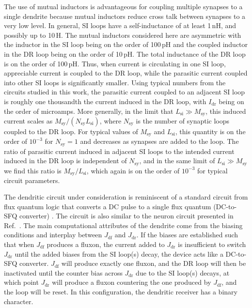 \documentclass[twocolumn]{article}
\newcommand{\onlinecite}[1]{\hspace{-1 ex} \nocite{#1}\citenum{#1}}
\begin{document}
The use of mutual inductors is advantageous for coupling multiple synapses to a single dendrite because mutual inductors reduce cross talk between synapses to a very low level. In general, SI loops have a self-inductance of at least 1\,nH, and possibly up to 10\,\textmu H. The mutual inductors considered here are asymmetric with the inductor in the SI loop being on the order of 100\,pH and the coupled inductor in the DR loop being on the order of 10\,pH. The total inductance of the DR loop is on the order of 100\,pH. Thus, when current is circulating in one SI loop, appreciable current is coupled to the DR loop, while the parasitic current coupled into other SI loops is significantly smaller. Using typical numbers from the circuits studied in this work, the parasitic current coupled to an adjacent SI loop is roughly one thousandth the current induced in the DR loop, with $I_{\mathrm{dr}}$ being on the order of microamps. More generally, in the limit that $L_{\mathrm{si}} \gg M_{\mathrm{sy}}$, this induced current scales as $M_{\mathrm{sy}}/(N_{\mathrm{sy}}L_{\mathrm{si}})$, where $N_{\mathrm{sy}}$ is the number of synaptic loops coupled to the DR loop. For typical values of $M_{\mathrm{sy}}$ and $L_{\mathrm{si}}$, this quantity is on the order of $10^{-3}$ for $N_{\mathrm{sy}}=1$ and decreases as synapses are added to the loop. The ratio of parasitic current induced in adjacent SI loops to the intended current induced in the DR loop is independent of $N_{\mathrm{sy}}$, and in the same limit of $L_{\mathrm{si}} \gg M_{\mathrm{sy}}$ we find this ratio is $M_{\mathrm{sy}}/L_{\mathrm{si}}$, which again is on the order of $10^{-3}$ for typical circuit parameters.

The dendritic circuit under consideration is reminiscent of a standard circuit from flux quantum logic that converts a DC pulse to a single flux quantum (DC-to-SFQ converter) \cite{vatu1998,ka1999}. The circuit is also similar to the neuron circuit presented in Ref.\,\onlinecite{crsc2010}. The main computational attributes of the dendrite come from the biasing conditions and interplay between $J_{\mathrm{df}}$ and $J_{\mathrm{dr}}$. If the biases are established such that when $J_{\mathrm{df}}$ produces a fluxon, the current added to $J_{\mathrm{dr}}$ is insufficient to switch $J_{\mathrm{dr}}$ until the added biases from the SI loop(s) decay, the device acts like a DC-to-SFQ converter. $J_{\mathrm{df}}$ will produce exactly one fluxon, and the DR loop will then be inactivated until the counter bias across $J_{\mathrm{dr}}$ due to the SI loop(s) decays, at which point $J_{\mathrm{dr}}$ will produce a fluxon countering the one produced by $J_{\mathrm{df}}$, and the loop will be reset. In this configuration, the dendritic receiver has a binary character.
\end{document}
